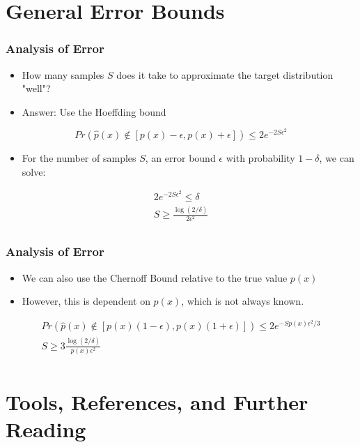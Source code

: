 \documentclass{beamer}
\begin{document}
\section{General Error Bounds}
\begin{frame}
  \frametitle{Analysis of Error}
  \begin{itemize}
    \item How many samples $S$ does it take to approximate the target distribution "well"?
    \item Answer: Use the Hoeffding bound
  \end{itemize}
  \begin{equation*}
    Pr \left( \hat{p}(x) \not\in \left[p(x) - \epsilon, p(x) + \epsilon \right] \right) \leq 2 e^{-2S \epsilon^2}
  \end{equation*}
  \begin{itemize}
    \item For the number of samples $S$, an error bound $\epsilon$ with probability $1 - \delta$,
      we can solve:
  \end{itemize}
  \begin{gather*}
    2e^{-2S \epsilon^2} \leq \delta \\
    S \geq \frac{\log(2 / \delta)}{2 \epsilon^2}  \\
  \end{gather*}
\end{frame}

\begin{frame}
  \frametitle{Analysis of Error}
  \begin{itemize}
    \item We can also use the Chernoff Bound relative to the true value $p(x)$
    \item However, this is dependent on $p(x)$, which is not always known.
  \end{itemize}
  \begin{gather*}
    Pr \left( \hat{p}(x) \not\in \left[p(x)(1 - \epsilon), p(x)(1 + \epsilon) \right] \right) \leq 2 e^{-S p(x) \epsilon^2 / 3} \\
    S \geq 3 \frac{\log \left(2 / \delta \right)}{p(x) \epsilon^2} \\
  \end{gather*}
\end{frame}



\section{Tools, References, and Further Reading}
\end{document}
